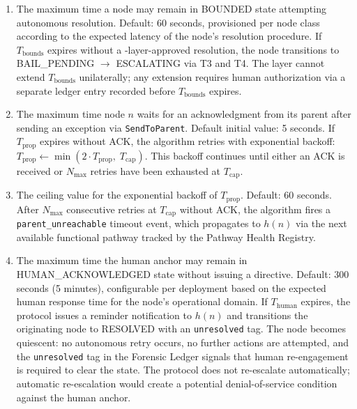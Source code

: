 \begin{enumerate}
    \item[\textbf{$T_{\text{bounds}}$ — Bounds Engine resolution timeout.}] The maximum time a node may remain in BOUNDED state attempting autonomous resolution. Default: 60 seconds, provisioned per node class according to the expected latency of the node's resolution procedure. If $T_{\text{bounds}}$ expires without a \fact-layer-approved resolution, the node transitions to BAIL\_PENDING $\rightarrow$ ESCALATING via T3 and T4. The \fact{} layer cannot extend $T_{\text{bounds}}$ unilaterally; any extension requires human authorization via a separate ledger entry recorded before $T_{\text{bounds}}$ expires.

    \item[\textbf{$T_{\text{prop}}$ — Per-hop propagation timeout.}] The maximum time node $n$ waits for an acknowledgment from its parent after sending an exception via \texttt{SendToParent}. Default initial value: 5 seconds. If $T_{\text{prop}}$ expires without ACK, the algorithm retries with exponential backoff: $T_{\text{prop}} \leftarrow \min(2 \cdot T_{\text{prop}},\; T_{\text{cap}})$. This backoff continues until either an ACK is received or $N_{\max}$ retries have been exhausted at $T_{\text{cap}}$.

    \item[\textbf{$T_{\text{cap}}$ — Maximum propagation timeout value.}] The ceiling value for the exponential backoff of $T_{\text{prop}}$. Default: 60 seconds. After $N_{\max}$ consecutive retries at $T_{\text{cap}}$ without ACK, the algorithm fires a \texttt{parent\_unreachable} timeout event, which propagates to $h(n)$ via the next available functional pathway tracked by the Pathway Health Registry.

    \item[\textbf{$T_{\text{human}}$ — Human acknowledgment timeout.}] The maximum time the human anchor may remain in HUMAN\_ACKNOWLEDGED state without issuing a directive. Default: 300 seconds (5 minutes), configurable per deployment based on the expected human response time for the node's operational domain. If $T_{\text{human}}$ expires, the protocol issues a reminder notification to $h(n)$ and transitions the originating node to RESOLVED with an \texttt{unresolved} tag. The node becomes quiescent: no autonomous retry occurs, no further actions are attempted, and the \texttt{unresolved} tag in the Forensic Ledger signals that human re-engagement is required to clear the state. The protocol does not re-escalate automatically; automatic re-escalation would create a potential denial-of-service condition against the human anchor.
\end{enumerate}

